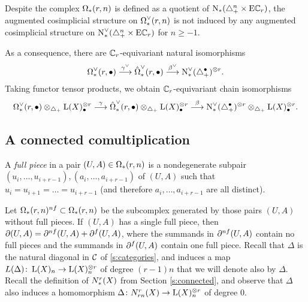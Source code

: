 \begin{remark}
	Despite the complex $\Om(r,n)$ is defined as a quotient of $\chains(\asimplex^n\times \EC_r)$, the augmented cosimplicial structure on $\Omd(r,n)$ is not induced by any augmented cosimplicial structure on $\cochains(\asimplex^n\times \EC_r)$ for $n\geq -1$.
\end{remark}
As a consequence, there are $\Cyc_r$-equivariant natural isomorphisms
\[\Omd(r,\bullet)\overset{\gamma^\dd}{\lra} \Omhatd(r,\bullet)\overset{\beta^\dd}{\lra} \cochains(\asimplex^\bullet)^{\otimes r}.\]
Taking functor tensor products, we obtain $\Cyc_r$-equivariant chain isomorphisms
\[\Omd(r,\bullet)\otimes_{\asimplex} \rA(X)_\bullet^{\otimes r}\overset{\gamma}{\lra} \Omhatd(r,\bullet)\otimes_{\asimplex} \rA(X)_\bullet^{\otimes r}\overset{\beta}{\lra} \cochains(\asimplex^\bullet)^{\otimes r}\otimes_{\asimplex} \rA(X)_\bullet^{\otimes r}.\]




\subsection{A connected comultiplication}\label{s:mainresult} A \emph{full piece} in a pair $(U,A)\in \Om(r,n)$ is a nondegenerate subpair $(u_i,\ldots,u_{i+r-1}),(a_i,\ldots,a_{i+r-1})$ of $(U,A)$ such that $u_i = u_{i+1} = \ldots = u_{i+r-1}$ (and therefore $a_i,\ldots,a_{i+r-1}$ are all distinct).

Let $\Om(r,n)^{\nf}\subset \Om(r,n)$ be the subcomplex generated by those pairs $(U,A)$ without full pieces. If $(U,A)$ has a single full piece, then $\partial(U,A) = \partial^{\nf}(U,A) + \partial^{\f}(U,A)$, where the summands in $\partial^{\nf}(U,A)$ contain no full pieces and the summands in $\partial^{\f}(U,A)$ contain one full piece. Recall that $\Delta$ is the natural diagonal in $\cC$ of \ref{s:categories}, and induces a map $L(\Delta)\colon \rA(X)_n\to \rA(X)_n^{\otimes r}$ of degree $(r-1)n$ that we will denote also by $\Delta$. Recall the definition of $\rcadenas(X)$ from Section \ref{s:connected}, and observe that $\Delta$ also induces a homomorphism $\Delta\colon \rcadenas[rn](X)\to \rA(X)_n^{\otimes r}$ of degree $0$. 

\renewcommand{\Psiom}{\Psi}

